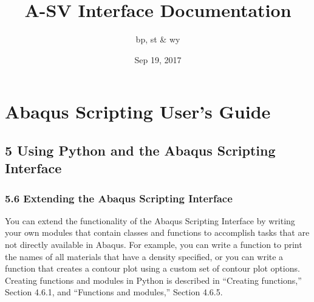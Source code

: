 \documentclass[letterpaper,10pt,english]{sphinxmanual}
\title{A-SV Interface Documentation}
\date{Sep 19, 2017}
\author{bp, st \& wy}
\begin{document}
\maketitle
\sphinxtableofcontents
{}\label{\detokenize{index::doc}}



\chapter{Abaqus Scripting User’s Guide}
\label{\detokenize{abq_script_guide:welcome-to-a-sv-interface-s-documentation}}\label{\detokenize{abq_script_guide::doc}}\label{\detokenize{abq_script_guide:abaqus-scripting-user-s-guide}}

\section{5 Using Python and the Abaqus Scripting Interface}
\label{\detokenize{abq_script_guide:using-python-and-the-abaqus-scripting-interface}}

\subsection{5.6 Extending the Abaqus Scripting Interface}
\label{\detokenize{abq_script_guide:extending-the-abaqus-scripting-interface}}
You can extend the functionality of the Abaqus Scripting Interface by writing your own modules that contain classes and functions to accomplish tasks that are not directly available in Abaqus. For example, you can write a function to print the names of all materials that have a density specified, or you can write a function that creates a contour plot using a custom set of contour plot options. Creating functions and modules in Python is described in “Creating functions,” Section 4.6.1, and “Functions and modules,” Section 4.6.5.
\end{document}

